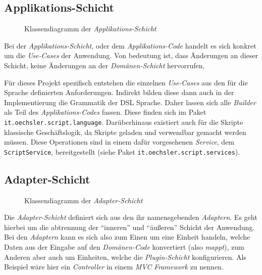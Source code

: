 \subsection{Applikations-Schicht}
\label{subsec:appliktions_schicht}

\begin{sidewaysfigure}
    \centering


    \caption{Klassendiagramm der \emph{Applikations-Schicht}}
    \label{fig:application}
\end{sidewaysfigure}

Bei der \emph{Applikations-Schicht}, oder dem \emph{Applikations-Code} handelt es sich konkret um die \emph{Use-Cases} der Anwendung.
Von bedeutung ist, dass Änderungen an dieser Schicht, keine Änderungen an der \emph{Domänen-Schicht} hervorrufen.

Für dieses Projekt spezifisch entstehen die einzelnen \emph{Use-Cases} aus den für die Sprache definierten Anforderungen. 
Indirekt bilden diese dann auch in der Implementierung die Grammatik der DSL Sprache.
Daher lassen sich alle \emph{Builder} als Teil des \emph{Applikations-Codes} fassen.
Diese finden sich im Paket \texttt{it.oechsler.script.language}.
Darüberhinaus existiert auch für die Skripte klassische Geschäftslogik, da Skripte geladen und verwendbar gemacht werden müssen.
Diese Operationen sind in einem dafür vorgesehenen \emph{Service}, dem \texttt{ScriptService}, bereitgestellt (siehe Paket \texttt{it.oechsler.script.services}).

\subsection{Adapter-Schicht}
\label{subsec:adapter_schicht}

\begin{figure}[H]
    \centering


    \caption{Klassendiagramm der \emph{Adapter-Schicht}}
    \label{fig:adapter}
\end{figure}

Die \emph{Adapter-Schicht} definiert sich aus den ihr namensgebenden \emph{Adaptern}.
Es geht hierbei um die abtrennung der \enquote{inneren} und \enquote{äußeren} Schicht der Anwendung.
Bei den \emph{Adaptern} kann es sich also zum Einen um eine Einheit handeln, welche Daten aus der Eingabe auf den \emph{Domänen-Code} konvertiert (also \emph{mappt}), zum Anderen aber auch um Einheiten, welche die \emph{Plugin-Schicht} konfigurieren. 
Als Beispiel wäre hier ein \emph{Controller} in einem \emph{MVC} \emph{Framework} zu nennen.

